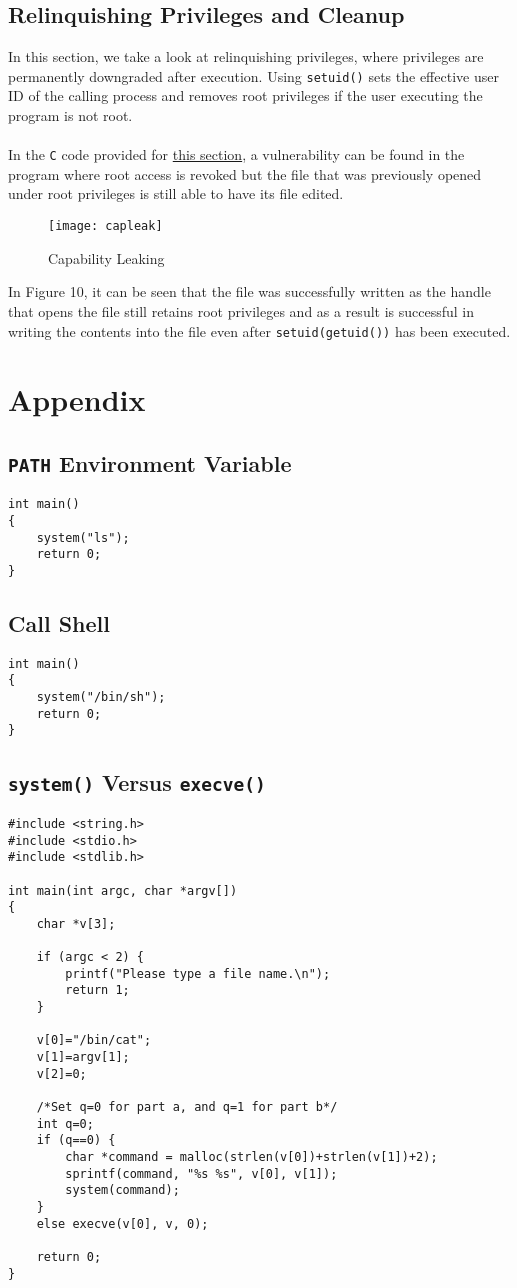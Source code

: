 \documentclass[a4paper,12pt]{article}
\begin{document}
\subsection{Relinquishing Privileges and Cleanup}
In this section, we take a look at relinquishing privileges, where privileges are permanently downgraded after execution. Using \texttt{setuid()} sets the effective user ID of the calling process and removes root privileges if the user executing the program is not root.\\\\In the \texttt{C} code provided for \hyperref[Appsec:3.72]{this section}, a vulnerability can be found in the program where root access is revoked but the file that was previously opened under root privileges is still able to have its file edited. 
\begin{figure}[H]
	\centering
	\texttt{[image: capleak]}
	\caption{Capability Leaking}
	\label{fig:capleak}
\end{figure}
\noindent In Figure 10, it can be seen that the file was successfully written as the handle that opens the file still retains root privileges and as a result is successful in writing the contents into the file even after \texttt{setuid(getuid())} has been executed.
\newpage
\section{Appendix}
\subsection{\texttt{PATH} Environment Variable}
\label{Appsec:3.6}
\begin{verbatim}
int main()
{
    system("ls");
    return 0;
}
\end{verbatim}
\subsection{Call Shell}
\label{Appsec:3.6.2}
\begin{verbatim}
int main()
{
    system("/bin/sh");
    return 0;
}
\end{verbatim}
\subsection{\texttt{system()} Versus \texttt{execve()}}
\label{Appsec:sysexec}
\begin{verbatim}
#include <string.h>
#include <stdio.h>
#include <stdlib.h>

int main(int argc, char *argv[])
{
    char *v[3];

    if (argc < 2) {
        printf("Please type a file name.\n");
        return 1;
    }

    v[0]="/bin/cat";
    v[1]=argv[1];
    v[2]=0;

    /*Set q=0 for part a, and q=1 for part b*/
    int q=0;
    if (q==0) {
        char *command = malloc(strlen(v[0])+strlen(v[1])+2);
        sprintf(command, "%s %s", v[0], v[1]);
        system(command);
    }
    else execve(v[0], v, 0);

    return 0;
}
\end{verbatim}
\end{document}
